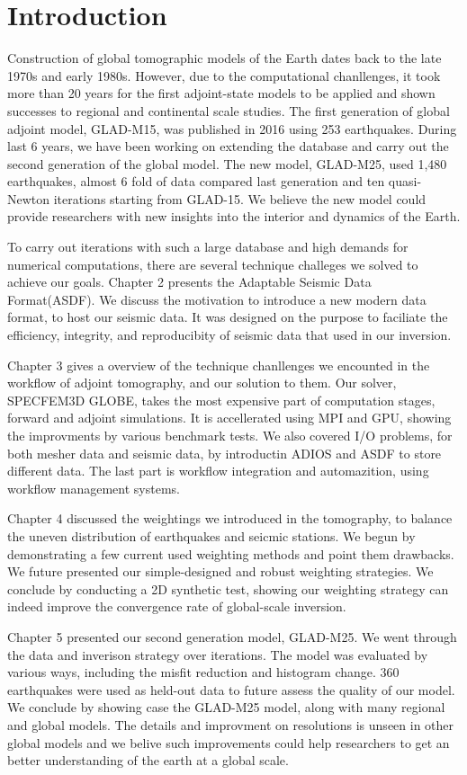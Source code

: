 \chapter{Introduction\label{ch:intro}}

Construction of global tomographic models of the Earth dates back to the late 1970s
and early 1980s. However, due to the computational chanllenges, it took more
than 20 years for the first adjoint-state models to be applied and shown successes
to regional and continental scale studies. The first generation of global adjoint 
model, GLAD-M15, was published in 2016 using 253 earthquakes.
During last 6 years, we have been working on extending the database and carry out
the second generation of the global model. The new model, GLAD-M25, used 1,480 earthquakes,
almost 6 fold of data compared last generation and ten quasi-Newton iterations starting
from GLAD-15. We believe the new model could provide researchers with new insights into
the interior and dynamics of the Earth.

To carry out iterations with such a large database and high demands for numerical
computations, there are several technique challeges we solved to achieve our goals.
Chapter 2 presents the Adaptable Seismic Data Format(ASDF). We discuss the motivation
to introduce a new modern data format, to host our seismic data. It was designed on
the purpose to faciliate the efficiency, integrity, and reproducibity
of seismic data that used in our inversion.

Chapter 3 gives a overview of the technique chanllenges we encounted in the workflow
of adjoint tomography, and our solution to them.
Our solver, SPECFEM3D GLOBE, takes the most expensive part of computation stages,
forward and adjoint simulations. It is accellerated using MPI and GPU, showing the
improvments by various benchmark tests. We also covered I/O problems, for both
mesher data and seismic data, by introductin ADIOS and ASDF to store different data.
The last part is workflow integration and automazition, using workflow management systems.

Chapter 4 discussed the weightings we introduced in the tomography, to balance
the uneven distribution of earthquakes and seicmic stations. We begun by demonstrating
a few current used weighting methods and point them drawbacks. We future presented
our simple-designed and robust weighting strategies. We conclude by conducting a 2D synthetic
test, showing our weighting strategy can indeed improve the convergence rate of global-scale
inversion.


Chapter 5 presented our second generation model, GLAD-M25. We went through the data and inverison
strategy over iterations. The model was evaluated by
various ways, including the misfit reduction and histogram change.
360 earthquakes were used as held-out data to future assess the quality of our model.
We conclude by showing case the GLAD-M25 model, along with many regional and global models. The details and improvment on resolutions is unseen in other global models and we belive such improvements could help researchers to get an better understanding of the earth at a global scale.
